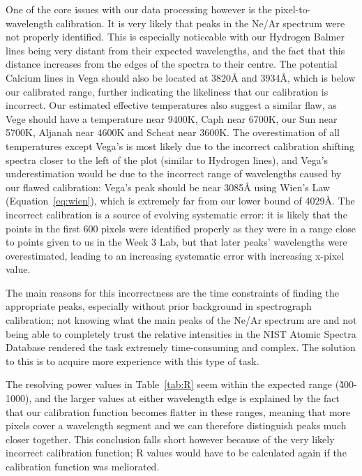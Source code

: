 \documentclass[twocolumn]{aastex702}
\begin{document}
  		One of the core issues with our data processing however is the pixel-to-wavelength calibration. It is very likely that peaks in the Ne/Ar spectrum were not properly identified. This is especially noticeable with our Hydrogen Balmer lines being very distant from their expected wavelengths, and the fact that this distance increases from the edges of the spectra to their centre. The potential Calcium lines in Vega should also be located at 3820Å and 3934Å, which is below our calibrated range, further indicating the likeliness that our calibration is incorrect. Our estimated effective temperatures also suggest a similar flaw, as Vege should have a temperature near 9400K, Caph near 6700K, our Sun near 5700K, Aljanah near 4600K and Scheat near 3600K. The overestimation of all temperatures except Vega's is most likely due to the incorrect calibration shifting spectra closer to the left of the plot (similar to Hydrogen lines), and Vega's underestimation would be due to the incorrect range of wavelengths caused by our flawed calibration: Vega's peak should be near 3085Å using Wien's Law (Equation~\ref{eq:wien}), which is extremely far from our lower bound of 4029Å. The incorrect calibration is a source of evolving systematic error: it is likely that the points in the first 600 pixels were identified properly as they were in a range close to points given to us in the Week 3 Lab, but that later peaks' wavelengths were overestimated, leading to an increasing systematic error with increasing x-pixel value.
  	
  		The main reasons for this incorrectness are the time constraints of finding the appropriate peaks, especially without prior background in spectrograph calibration; not knowing what the main peaks of the Ne/Ar spectrum are and not being able to completely trust the relative intensities in the NIST Atomic Spectra Database rendered the task extremely time-consuming and complex. The solution to this is to acquire more experience with this type of task.
  		
  		The resolving power values in Table~\ref{tab:R} seem within the expected range (\~400-1000), and the larger values at either wavelength edge is explained by the fact that our calibration function becomes flatter in these ranges, meaning that more pixels cover a wavelength segment and we can therefore distinguish peaks much closer together. This conclusion falls short however because of the very likely incorrect calibration function; R values would have to be calculated again if the calibration function was meliorated.
  		
\end{document}
